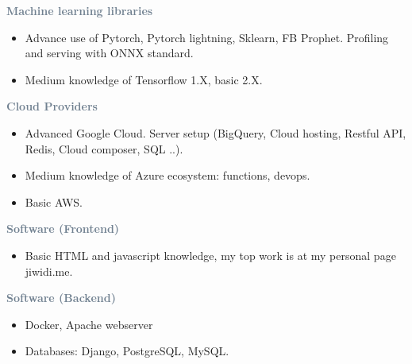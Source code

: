 


\textcolor{SlateGrey}{\textbf{Machine learning libraries}}
\newline

\begin{itemize}
    \item Advance use of Pytorch, Pytorch lightning, Sklearn, FB Prophet. Profiling and serving with ONNX standard.
    \item Medium knowledge of Tensorflow 1.X, basic 2.X.
\end{itemize}

\textcolor{SlateGrey}{\textbf{Cloud Providers}}
\newline

\begin{itemize}
    \item Advanced Google Cloud. Server setup (BigQuery, Cloud hosting, Restful API, Redis, Cloud composer, SQL ..).
    \item Medium knowledge of Azure ecosystem: functions, devops.
    \item Basic AWS.
\end{itemize}

\textcolor{SlateGrey}{\textbf{Software (Frontend)}}
\newline

\begin{itemize}
    \item Basic HTML and javascript knowledge, my top work is at my personal page jiwidi.me.
\end{itemize}

\textcolor{SlateGrey}{\textbf{Software (Backend)}}
\newline

\begin{itemize}
    \item Docker, Apache webserver
    \item Databases: Django, PostgreSQL, MySQL. 
\end{itemize}



